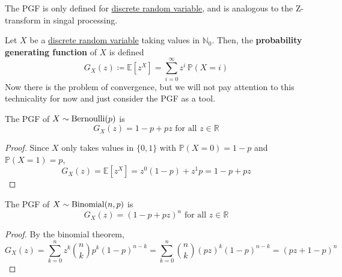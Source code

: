 	The PGF is only defined for \hyperref[def:discrete-random-variable]{discrete random variable}, and is analogous to the Z-transform in singal processing. 

	\begin{definition}
	  \label{def:probability-generating-function}
		Let $X$ be a \hyperref[def:discrete-random-variable]{discrete random variable} taking values in $\mathbb{N}_0$. Then, the \textbf{probability generating function} of $X$ is defined 
		\begin{equation}
			G_X (z) \coloneqq \mathbb{E}[z^X] = \sum_{i=0}^\infty z^i \, \mathbb{P}(X = i)
		\end{equation}
		Now there is the problem of convergence, but we will not pay attention to this technicality for now and just consider the PGF as a tool. 
	\end{definition}

	\begin{theorem}
	  \label{thm:pgf-of-bernoulli-distribution}
		The PGF of \hyperref[def:indicator-bernoulli-random-variable]{$X \sim \operatorname{Bernoulli}(p)$} is 
		\begin{equation}
			G_X (z) = 1 - p + p z \text{ for all } z \in \mathbb{R}
		\end{equation}
	\end{theorem}
	\begin{proof}
		Since $X$ only takes values in $\{0, 1\}$ with $\mathbb{P}(X = 0) = 1 - p$ and $\mathbb{P}(X = 1) = p$, 
		\begin{equation}
			G_X (z) = \mathbb{E}[z^X] = z^0 (1 - p) + z^1 p = 1 - p + p z
		\end{equation}
	\end{proof}

	\begin{theorem}
	  \label{thm:pgf-of-binomial-distribution}
		The PGF of \hyperref[def:binomial-random-variable]{$X \sim \operatorname{Binomial}(n, p)$} is 
		\begin{equation}
			G_X (z) = (1 - p + p z)^n \text{ for all } z \in \mathbb{R}
		\end{equation}
	\end{theorem}
	\begin{proof}
		By the binomial theorem, 
		\begin{equation}
			G_X (z) = \sum_{k=0}^n z^k \binom{n}{k} p^k (1 - p)^{n-k} = \sum_{k=0}^n \binom{n}{k} (p z)^k (1 - p)^{n-k} = (p z + 1 - p)^n
		\end{equation}
	\end{proof}

